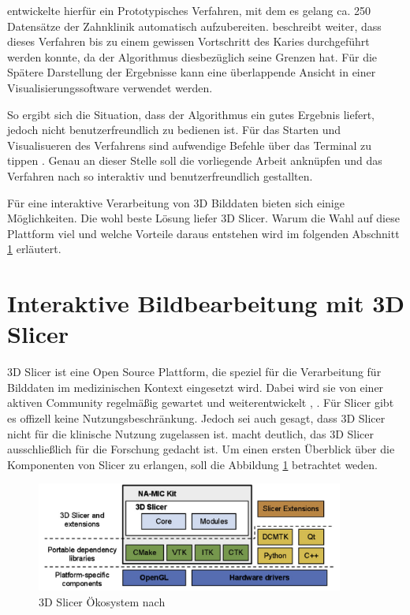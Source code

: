 \citet{hoffmann2020} entwickelte hierfür ein Prototypisches Verfahren, mit dem
es gelang ca. 250 Datensätze der Zahnklinik automatisch aufzubereiten. \citet{hoffmann2020}
beschreibt weiter, dass dieses Verfahren bis zu einem gewissen Vortschritt des
Karies durchgeführt werden konnte, da der Algorithmus diesbezüglich seine Grenzen
hat. Für die Spätere Darstellung der Ergebnisse kann eine überlappende Ansicht
in einer Visualisierungssoftware verwendet werden.

So ergibt sich die Situation, dass der Algorithmus ein gutes Ergebnis liefert,
jedoch nicht benutzerfreundlich zu bedienen ist. Für das Starten und Visualisueren
des Verfahrens sind aufwendige Befehle über das Terminal zu tippen \citep[vgl.][Seite
53]{hoffmann2020}. Genau an dieser Stelle soll die vorliegende Arbeit anknüpfen
und das Verfahren nach \citet{hoffmann2020} so interaktiv und benutzerfreundlich
gestallten.

Für eine interaktive Verarbeitung von 3D Bilddaten bieten sich einige Möglichkeiten.
Die wohl beste Lösung liefer 3D Slicer. Warum die Wahl auf diese Plattform viel und
welche Vorteile daraus entstehen wird im folgenden Abschnitt \ref{sec:3d_slicer}
erläutert.

\pagebreak

\section{Interaktive Bildbearbeitung mit 3D Slicer}
\label{sec:3d_slicer} 3D Slicer ist eine Open Source Plattform, die speziel für die
Verarbeitung für Bilddaten im medizinischen Kontext eingesetzt wird. Dabei wird
sie von einer aktiven Community regelmäßig gewartet und weiterentwickelt \citep[vgl.][]{slicer2024},
\citep[vgl.][]{fedorov2012slicer}. Für Slicer gibt es offizell keine
Nutzungsbeschränkung. Jedoch sei auch gesagt, dass 3D Slicer nicht für die
klinische Nutzung zugelassen ist. \citet{fedorov2012slicer} macht deutlich, das 3D
Slicer ausschließlich für die Forschung gedacht ist. Um einen ersten Überblick
über die Komponenten von Slicer zu erlangen, soll die Abbildung \ref{fig:3d_slicer_oekosystem}
betrachtet weden.

\begin{figure}[h]
	\centering
	\includegraphics[width=0.9\textwidth]{img/3d_slicer_overview.jpg}
	\caption{3D Slicer Ökosystem nach \citet[Seite 1326]{fedorov2012slicer}}
	\label{fig:3d_slicer_oekosystem}
\end{figure}

